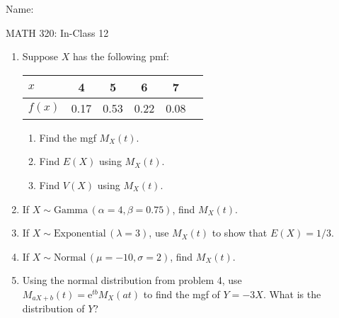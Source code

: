 \documentclass{article}
\newcommand{\follow}[1]{\sim \text{#1}\,}		%
\newcommand{\e}{\mathrm{e}}		%
\begin{document}
\hspace{375pt}Name:

\begin{center}
{\Huge MATH 320: In-Class 12}

\end{center}
\bigskip\bigskip


\begin{enumerate}

    \item Suppose $X$ has the following pmf:\hspace{20pt}
    \begin{tabular}{| l || c | c | c | c | c |}
        \hline
        $x$ & 4 & 5 & 6 & 7\\
        \hline
        $f(x)$ & 0.17 & 0.53 & 0.22 & 0.08\\
        \hline
    \end{tabular}\bigskip
    \begin{enumerate}
        \item Find the mgf $M_X(t)$.\vspace{150pt}
        \item Find $E(X)$ using $M_X(t)$.\vspace{150pt}
        \item Find $V(X)$ using $M_X(t)$.\vspace{200pt}
    \end{enumerate}

    \item If $X \follow{Gamma}(\alpha = 4, \beta = 0.75)$, find $M_X(t)$.\vspace{70pt}
    
    \item If $X \follow{Exponential}(\lambda = 3)$, use $M_X(t)$ to show that $E(X) = 1/3$.\vspace{250pt}
    
    \item If $X \follow{Normal}(\mu = -10, \sigma = 2)$, find $M_X(t)$.\vspace{70pt}
    
    \item Using the normal distribution from problem 4, use $M_{aX + b}(t) = \e^{tb} M_X(at)$ to find the mgf of $Y = -3X$. What is the distribution of $Y$?    
    
    \end{enumerate}
\end{document}
